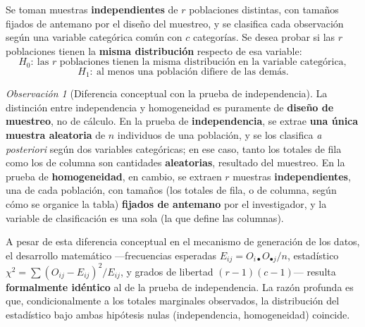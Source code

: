 \documentclass[11pt,a4paper]{article}
\theoremstyle{plain}
\theoremstyle{definition}
\theoremstyle{remark}
\newtheorem{observacion}[teorema]{Observación}
\begin{document}
Se toman muestras \textbf{independientes} de $r$ poblaciones distintas, con tamaños fijados de antemano por el diseño del muestreo, y se clasifica cada observación según una variable categórica común con $c$ categorías. Se desea probar si las $r$ poblaciones tienen la \textbf{misma distribución} respecto de esa variable:
\[
H_0:\ \text{las } r \text{ poblaciones tienen la misma distribución en la variable categórica},
\]
\[
H_1:\ \text{al menos una población difiere de las demás}.
\]

\begin{observacion}[Diferencia conceptual con la prueba de independencia]
La distinción entre independencia y homogeneidad es puramente de \textbf{diseño de muestreo}, no de cálculo. En la prueba de \textbf{independencia}, se extrae \textbf{una única muestra aleatoria} de $n$ individuos de una población, y se los clasifica \emph{a posteriori} según dos variables categóricas; en ese caso, tanto los totales de fila como los de columna son cantidades \textbf{aleatorias}, resultado del muestreo. En la prueba de \textbf{homogeneidad}, en cambio, se extraen $r$ muestras \textbf{independientes}, una de cada población, con tamaños (los totales de fila, o de columna, según cómo se organice la tabla) \textbf{fijados de antemano} por el investigador, y la variable de clasificación es una sola (la que define las columnas).

A pesar de esta diferencia conceptual en el mecanismo de generación de los datos, el desarrollo matemático —frecuencias esperadas $E_{ij}=O_{i\bullet}O_{\bullet j}/n$, estadístico $\chi^2=\sum (O_{ij}-E_{ij})^2/E_{ij}$, y grados de libertad $(r-1)(c-1)$— resulta \textbf{formalmente idéntico} al de la prueba de independencia. La razón profunda es que, condicionalmente a los totales marginales observados, la distribución del estadístico bajo ambas hipótesis nulas (independencia, homogeneidad) coincide.
\end{observacion}
\end{document}

